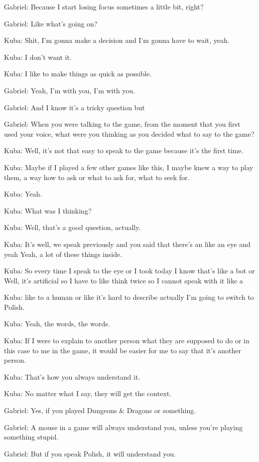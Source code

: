 Gabriel: Because I start losing focus sometimes a little bit, right?

Gabriel: Like what's going on?

Kuba: Shit, I'm gonna make a decision and I'm gonna have to wait, yeah.

Kuba: I don't want it.

Kuba: I like to make things as quick as possible.

Gabriel: Yeah, I'm with you, I'm with you.

Gabriel: And I know it's a tricky question but

Gabriel: When you were talking to the game, from the moment that you first used your voice, what were you thinking as you decided what to say to the game?

Kuba: Well, it's not that easy to speak to the game because it's the first time.

Kuba: Maybe if I played a few other games like this, I maybe knew a way to play them, a way how to ask or what to ask for, what to seek for.

Kuba: Yeah.

Kuba: What was I thinking?

Kuba: Well, that's a good question, actually.

Kuba: It's well, we speak previously and you said that there's an like an eye and yeah Yeah, a lot of these things inside.

Kuba: So every time I speak to the eye or I took today I know that's like a bot or Well, it's artificial so I have to like think twice so I cannot speak with it like a

Kuba: like to a human or like it's hard to describe actually I'm going to switch to Polish.

Kuba: Yeah, the words, the words.

Kuba: If I were to explain to another person what they are supposed to do or in this case to me in the game, it would be easier for me to say that it's another person.

Kuba: That's how you always understand it.

Kuba: No matter what I say, they will get the context.

Gabriel: Yes, if you played Dungeons & Dragons or something.

Gabriel: A mouse in a game will always understand you, unless you're playing something stupid.

Gabriel: But if you speak Polish, it will understand you.

